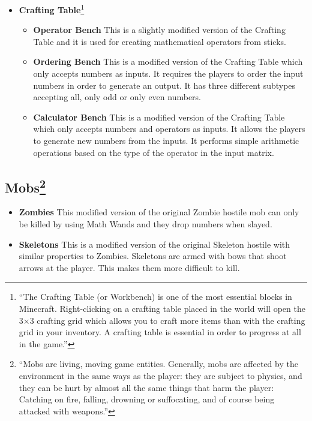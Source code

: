 \begin{itemize}
\large \item \textbf{Crafting Table}\footnote{``The Crafting Table (or Workbench) is one of the most essential blocks in Minecraft. Right-clicking on a crafting table placed in the world will open the 3×3 crafting grid which allows you to craft more items than with the crafting grid in your inventory. A crafting table is essential in order to progress at all in the game.''\cite{website:minecraft-table}}

\normalsize
\begin{itemize}
\item \textbf{Operator Bench}
\newline
\normalsize This is a slightly modified version of the Crafting Table and it is used for creating mathematical operators from sticks.	

\item \textbf{Ordering Bench}
\newline
\normalsize This is a modified version of the Crafting Table which only accepts numbers as inputs. It requires the players to order the input numbers in order to generate an output. It has three different subtypes accepting all, only odd or only even numbers.

\item \textbf{Calculator Bench}
\newline
\normalsize This is a modified version of the Crafting Table which only accepts numbers and operators as inputs. It allows the players to generate new numbers from the inputs. It performs simple arithmetic operations based on the type of the operator in the input matrix.
\end{itemize}
\end{itemize}

\subsection[Mobs]{Mobs\footnote{``Mobs are living, moving game entities. Generally, mobs are affected by the environment in the same ways as the player: they are subject to physics, and they can be hurt by almost all the same things that harm the player: Catching on fire, falling, drowning or suffocating, and of course being attacked with weapons.''\cite{website:minecraft-mobs}}}

\begin{itemize}
\item \textbf{Zombies}
\newline
\normalsize This modified version of the original Zombie hostile mob can only be killed by using Math Wands and they drop numbers when slayed.

\item \textbf{Skeletons}
\newline
\normalsize This is a modified version of the original Skeleton hostile with similar properties to Zombies. Skeletons are armed with bows that shoot arrows at the player. This makes them more difficult to kill.
\newline
\end{itemize}


